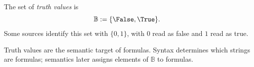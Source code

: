 \begin{tcolorbox}[colback=propbox, colframe=propborder, arc=2pt,
  left=6pt, right=6pt, top=4pt, bottom=4pt,
  title={\small\textbf{Definition (Truth Value)}},
  fonttitle=\small\bfseries]
\label{def:truth-value}
The set of \emph{truth values} is
\[
\mathbb{B} := \{\False,\True\}.
\]
Some sources identify this set with $\{0,1\}$, with $0$ read as false and
$1$ read as true.
\end{tcolorbox}

\begin{remark*}[Interpretation]
Truth values are the semantic target of formulas. Syntax determines which
strings are formulas; semantics later assigns elements of $\mathbb{B}$ to
formulas.
\end{remark*}
